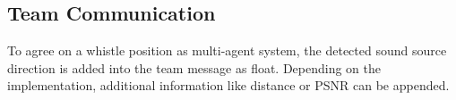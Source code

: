 

\subsection{Team Communication}
\label{subsec:03_teamCommunication}

To agree on a whistle position as multi-agent system, the detected sound source
direction is added into the team message as float.
Depending on the implementation, additional information like distance or
\ac{PSNR} can be appended.
